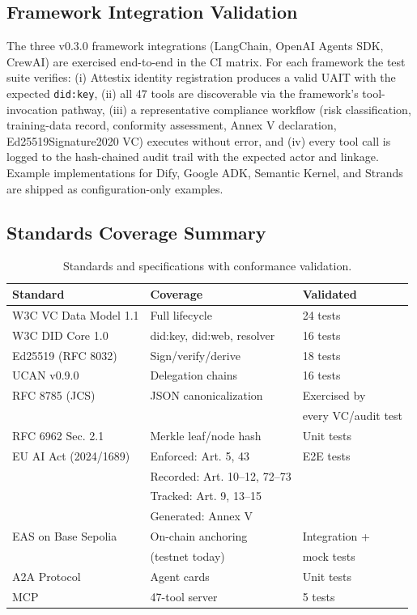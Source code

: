 \documentclass[conference]{IEEEtran}
\begin{document}
\subsection{Framework Integration Validation}
\label{sec:framework-validation}

The three v0.3.0 framework integrations (LangChain, OpenAI Agents SDK, CrewAI) are exercised end-to-end in the CI matrix. For each framework the test suite verifies: (i) Attestix identity registration produces a valid UAIT with the expected \texttt{did:key}, (ii) all 47 tools are discoverable via the framework's tool-invocation pathway, (iii) a representative compliance workflow (risk classification, training-data record, conformity assessment, Annex V declaration, Ed25519Signature2020 VC) executes without error, and (iv) every tool call is logged to the hash-chained audit trail with the expected actor and linkage. Example implementations for Dify, Google ADK, Semantic Kernel, and Strands are shipped as configuration-only examples.

\subsection{Standards Coverage Summary}

\begin{table}[htbp]
\centering
\caption{Standards and specifications with conformance validation.}
\label{tab:standards}
\begin{tabular}{lll}
\toprule
\textbf{Standard} & \textbf{Coverage} & \textbf{Validated} \\
\midrule
W3C VC Data Model 1.1 & Full lifecycle & 24 tests \\
W3C DID Core 1.0 & did:key, did:web, resolver & 16 tests \\
Ed25519 (RFC 8032) & Sign/verify/derive & 18 tests \\
UCAN v0.9.0 & Delegation chains & 16 tests \\
RFC 8785 (JCS) & JSON canonicalization & Exercised by \\
 & & every VC/audit test \\
RFC 6962 Sec. 2.1 & Merkle leaf/node hash & Unit tests \\
EU AI Act (2024/1689) & Enforced: Art. 5, 43 & E2E tests \\
 & Recorded: Art. 10--12, 72--73 & \\
 & Tracked: Art. 9, 13--15 & \\
 & Generated: Annex V & \\
EAS on Base Sepolia & On-chain anchoring & Integration + \\
 & (testnet today) & mock tests \\
A2A Protocol & Agent cards & Unit tests \\
MCP & 47-tool server & 5 tests \\
\bottomrule
\end{tabular}
\end{table}
\end{document}

